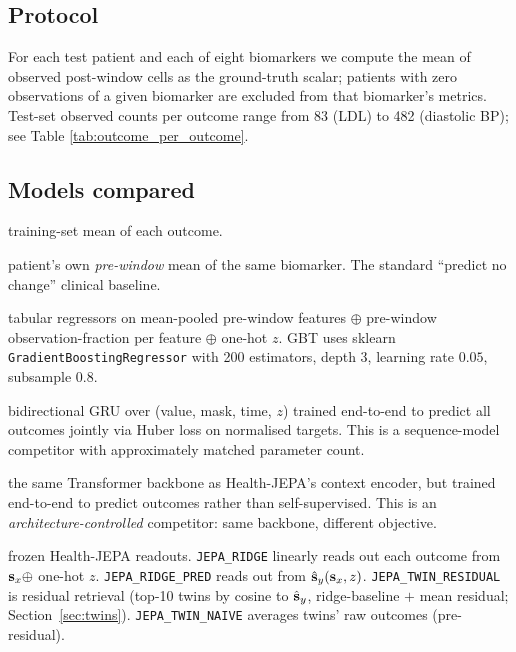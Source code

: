 \subsection{Protocol}

For each test patient and each of eight biomarkers we compute the mean
of observed post-window cells as the ground-truth scalar; patients with
zero observations of a given biomarker are excluded from that
biomarker's metrics. Test-set observed counts per outcome range from 83
(LDL) to 482 (diastolic BP); see Table \ref{tab:outcome_per_outcome}.

\subsection{Models compared}

\begin{description}[leftmargin=*,itemsep=2pt]
  \item[POP\_MEAN:] training-set mean of each outcome.
  \item[NO\_CHANGE:] patient's own \emph{pre-window} mean of the same
  biomarker. The standard ``predict no change'' clinical baseline.
  \item[RIDGE, MLP\_RAW, GBT:] tabular regressors on mean-pooled
  pre-window features $\oplus$ pre-window observation-fraction per feature
  $\oplus$ one-hot $z$. GBT uses sklearn \texttt{GradientBoostingRegressor}
  with 200 estimators, depth 3, learning rate $0.05$, subsample $0.8$.
  \item[GRU\_E2E:] bidirectional GRU over (value, mask, time, $z$)
  trained end-to-end to predict all outcomes jointly via Huber loss on
  normalised targets. This is a sequence-model competitor with
  approximately matched parameter count.
  \item[TSENCODER\_E2E:] the same Transformer backbone as Health-JEPA's
  context encoder, but trained end-to-end to predict outcomes rather
  than self-supervised. This is an \emph{architecture-controlled}
  competitor: same backbone, different objective.
  \item[JEPA\_RIDGE, JEPA\_RIDGE\_PRED, JEPA\_TWIN\_RESIDUAL,
  JEPA\_TWIN\_NAIVE:] frozen Health-JEPA readouts. \texttt{JEPA\_RIDGE}
  linearly reads out each outcome from $\mathbf{s}_x \oplus$ one-hot $z$.
  \texttt{JEPA\_RIDGE\_PRED} reads out from $\hat{\mathbf{s}}_y(\mathbf{s}_x, z)$.
  \texttt{JEPA\_TWIN\_RESIDUAL} is residual retrieval (top-10 twins by
  cosine to $\hat{\mathbf{s}}_y$, ridge-baseline $+$ mean residual;
  Section~\ref{sec:twins}). \texttt{JEPA\_TWIN\_NAIVE} averages twins'
  raw outcomes (pre-residual).
\end{description}

